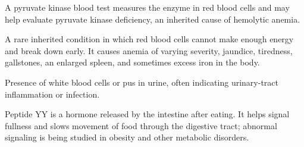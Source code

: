  A pyruvate kinase blood test measures the enzyme in red blood cells and may help evaluate pyruvate kinase deficiency, an inherited cause of hemolytic anemia.

 A rare inherited condition in which red blood cells cannot make enough energy and break down early. It causes anemia of varying severity, jaundice, tiredness, gallstones, an enlarged spleen, and sometimes excess iron in the body.

 Presence of white blood cells or pus in urine, often indicating urinary-tract inflammation or infection.

 Peptide YY is a hormone released by the intestine after eating. It helps signal fullness and slows movement of food through the digestive tract; abnormal signaling is being studied in obesity and other metabolic disorders.
